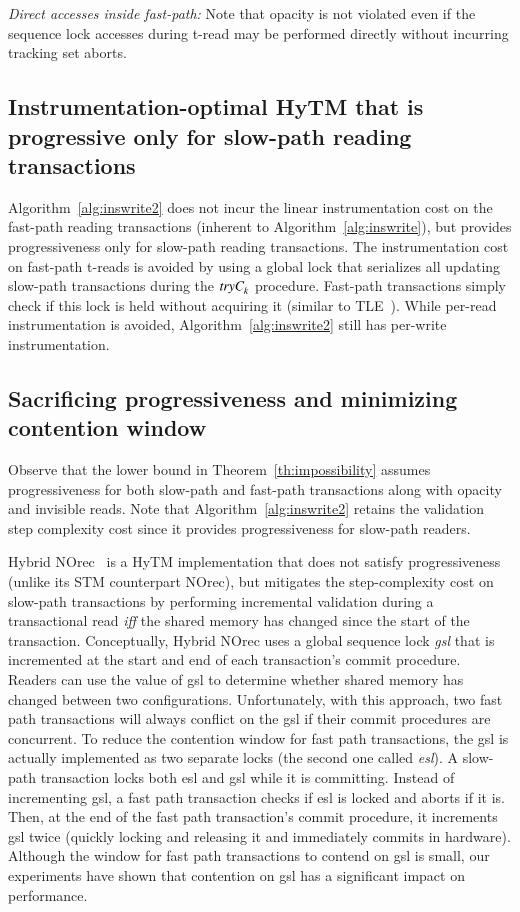 \vspace{1mm}\noindent\textit{Direct accesses inside fast-path:}
Note that opacity is not violated even if the sequence lock accesses during t-read may be performed directly without incurring tracking set aborts.

\subsection{Instrumentation-optimal HyTM that is progressive only for slow-path reading transactions}
Algorithm~\ref{alg:inswrite2} does not incur the linear instrumentation cost
on the fast-path reading transactions (inherent to Algorithm~\ref{alg:inswrite}), but provides progressiveness only
for slow-path reading transactions. 
The instrumentation cost on fast-path t-reads is avoided by using a global lock that serializes all updating slow-path transactions
during the $\textit{tryC}_k$ procedure. Fast-path transactions simply check if this lock is held without acquiring it (similar to TLE~\cite{tle}). While per-read instrumentation is avoided, Algorithm~\ref{alg:inswrite2} still has per-write instrumentation.

\subsection{Sacrificing progressiveness and minimizing contention window}
Observe that the lower bound in Theorem~\ref{th:impossibility} assumes progressiveness for both slow-path and fast-path transactions
along with opacity and invisible reads. Note that Algorithm~\ref{alg:inswrite2} retains the validation step complexity cost since it provides progressiveness for slow-path readers.

Hybrid NOrec~\cite{hybridnorec} is a HyTM implementation that does not satisfy progressiveness
(unlike its STM counterpart NOrec), but mitigates
the step-complexity cost on slow-path transactions by performing incremental validation 
during a transactional read \emph{iff} 
the shared memory has changed since the start of the transaction.
Conceptually, Hybrid NOrec uses a global sequence lock \emph{gsl} that is incremented 
at the start and end of each transaction's commit procedure.
Readers can use the value of gsl to determine whether shared memory has changed between two configurations.
Unfortunately, with this approach, two fast path transactions will always conflict on the gsl if their 
commit procedures are concurrent.
To reduce the contention window for fast path transactions, the gsl is actually implemented as two separate locks (the second one called \emph{esl}).
A slow-path transaction locks both esl and gsl while it is committing.
Instead of incrementing gsl, a fast path transaction checks if esl is locked and aborts if it is.
Then, at the end of the fast path transaction's commit procedure, 
it increments gsl twice (quickly locking and releasing it and immediately commits in hardware).
Although the window for fast path transactions to contend on gsl is small, our experiments have shown that contention on gsl has a significant impact on performance.


